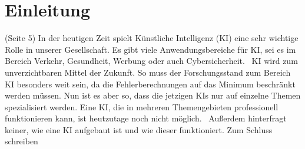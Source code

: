 \documentclass[11pt]{article}
\begin{document}
\section{Einleitung}
(Seite 5)
In der heutigen Zeit spielt Künstliche Intelligenz (KI) eine sehr wichtige Rolle in unserer
Gesellschaft.\label{1} Es gibt viele Anwendungsbereiche für KI, 
sei es im Bereich Verkehr, Gesundheit, Werbung oder auch Cybersicherheit.~\cite{useofki}
KI wird zum unverzichtbaren Mittel der Zukunft. So muss der
Forschungsstand zum Bereich KI besonders weit sein, da die Fehlerberechnungen auf das
Minimum beschränkt werden müssen.\label{2} Nun ist es aber so, dass die jetzigen KIs nur auf einzelne
Themen spezialisiert werden. Eine KI, die in mehreren Themengebieten
professionell funktionieren kann, ist heutzutage noch nicht möglich.~\cite{weakki}
Außerdem hinterfragt keiner, wie eine KI aufgebaut ist und wie dieser funktioniert.
Zum Schluss schreiben
\end{document}

